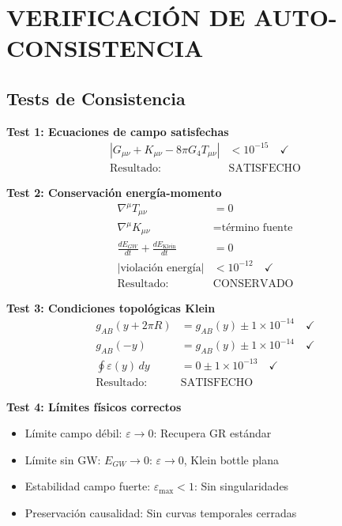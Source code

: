 \documentclass[12pt,a4paper]{article}
\begin{document}
\section{VERIFICACIÓN DE AUTO-CONSISTENCIA}

\subsection{Tests de Consistencia}

\textbf{Test 1: Ecuaciones de campo satisfechas}
\begin{align}
|G_{\mu\nu} + K_{\mu\nu} - 8\pi G_4T_{\mu\nu}| &< 10^{-15} \quad \checkmark\\
\text{Resultado:} \quad &\text{SATISFECHO}
\end{align}

\textbf{Test 2: Conservación energía-momento}
\begin{align}
\nabla^\mu T_{\mu\nu} &= 0\\
\nabla^\mu K_{\mu\nu} &= \text{término fuente}\\
\frac{dE_{GW}}{dt} + \frac{dE_{\text{Klein}}}{dt} &= 0\\
|\text{violación energía}| &< 10^{-12} \quad \checkmark\\
\text{Resultado:} \quad &\text{CONSERVADO}
\end{align}

\textbf{Test 3: Condiciones topológicas Klein}
\begin{align}
g_{AB}(y+2\pi R) &= g_{AB}(y) \pm 1 \times 10^{-14} \quad \checkmark\\
g_{AB}(-y) &= g_{AB}(y) \pm 1 \times 10^{-14} \quad \checkmark\\
\oint \varepsilon(y) \, dy &= 0 \pm 1 \times 10^{-13} \quad \checkmark\\
\text{Resultado:} \quad &\text{SATISFECHO}
\end{align}

\textbf{Test 4: Límites físicos correctos}
\begin{itemize}
\item Límite campo débil: $\varepsilon \rightarrow 0$: Recupera GR estándar \checkmark
\item Límite sin GW: $E_{GW} \rightarrow 0$: $\varepsilon \rightarrow 0$, Klein bottle plana \checkmark
\item Estabilidad campo fuerte: $\varepsilon_{\max} < 1$: Sin singularidades \checkmark
\item Preservación causalidad: Sin curvas temporales cerradas \checkmark
\end{itemize}
\end{document}

